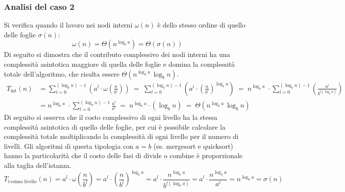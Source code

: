 \subsubsection*{Analisi del caso 2}
Si verifica quando il lavoro nei nodi interni \(\omega(n)\) è dello stesso ordine di quello delle foglie \(\sigma(n)\):
\[\omega(n) = \Theta(n^{\log_b a}) = \Theta (\sigma(n))\]
Di seguito si dimostra che il contributo complessivo dei nodi interni ha una complessità asintotica maggiore di quella delle
foglie e domina la complessità totale dell'algoritmo, che risulta essere \(\Theta(n^{\log_b a} \, \log_b n)\).
\begin{align*}
	T_{\text{int}}(n) &= \sum_{l=0}^{(\log_b n) - 1} \left( a^l \cdot \omega \! \left( \frac{n}{b^l} \right) \right) \; = \; \sum_{l=0}^{(\log_b n) - 1} \left( a^l \cdot \left( \frac{n}{b^l} \right)^{\log_b a} \right) \; = \; n^{\log_b a} \; \cdot \!\! \sum_{l=0}^{(\log_b n) - 1} \left( \frac{a^l}{b^{l (\log_b a)}} \right) \\[3pt]
	&= n^{\log_b a} \; \cdot \!\! \sum_{l=0}^{(\log_b n) - 1} \frac{a^l}{a^l} \; = \; n^{\log_b a} \cdot (\log_b n) \; = \; \Theta(n^{\log_b a} \, \log_b n)
\end{align*}
Di seguito si osserva che il costo complessivo di ogni livello ha la stessa complessità asintotica di quello delle foglie,
per cui è possibile calcolare la complessità totale moltiplicando la complessità di ogni livello per il numero di livelli.
Gli algoritmi di questa tipologia con \(a = b\) (es. mergesort e quicksort) hanno la particolarità che il costo delle fasi di divide o
combine è proporzionale alla taglia dell'istanza.
\[T_{\text{\(l\)-esimo livello}}(n) = a^l \cdot \omega \! \left( \frac{n}{b^l} \right) = a^l \cdot \left( \frac{n}{b^l} \right)^{\log_b a} = a^l \cdot \frac{n^{\log_b a}}{b^{l (\log_b a)}} = a^l \cdot \frac{n^{\log_b a}}{a^l} = n^{\log_b a} = \sigma(n)\]

\newpage

